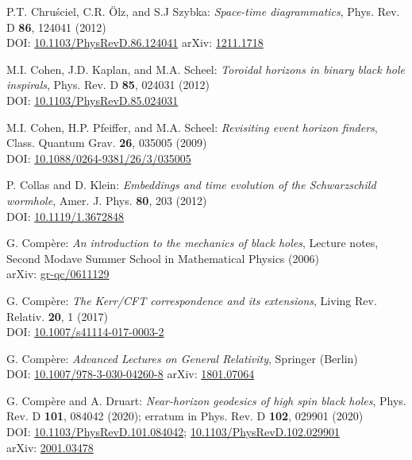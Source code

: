 \begin{thebibliography}{123}
P.T. Chru\'sciel, C.R. Ölz, and S.J Szybka:
{\em Space-time diagrammatics},
Phys. Rev. D {\bf 86}, 124041 (2012)\\
DOI:  \href{https://doi.org/10.1103/PhysRevD.86.124041}{10.1103/PhysRevD.86.124041}\hfill
arXiv: \href{https://arxiv.org/abs/1211.1718}{1211.1718}

M.I. Cohen, J.D. Kaplan, and M.A. Scheel:
{\em Toroidal horizons in binary black hole inspirals},
Phys. Rev. D {\bf 85}, 024031 (2012)\\
DOI:  \href{https://doi.org/10.1103/PhysRevD.85.024031}{10.1103/PhysRevD.85.024031}

M.I. Cohen, H.P. Pfeiffer, and M.A. Scheel:
{\em Revisiting event horizon finders},
Class. Quantum Grav. {\bf 26}, 035005 (2009)\\
DOI: \href{https://doi.org/10.1088/0264-9381/26/3/035005}{10.1088/0264-9381/26/3/035005}

P. Collas and D. Klein:
{\em Embeddings and time evolution of the Schwarzschild wormhole},
Amer. J. Phys. {\bf 80}, 203 (2012)\\
DOI: \href{https://doi.org/10.1119/1.3672848}{10.1119/1.3672848}

G. Compère:
{\em An introduction to the mechanics of black holes},
Lecture notes, Second Modave Summer School in Mathematical Physics (2006)\\
arXiv: \href{https://arxiv.org/abs/gr-qc/0611129}{gr-qc/0611129}

G. Compère:
{\em The Kerr/CFT correspondence and its extensions},
Living Rev. Relativ. {\bf 20}, 1 (2017)\\
DOI: \href{https://doi.org/10.1007/s41114-017-0003-2}{10.1007/s41114-017-0003-2}

G. Compère:
{\em Advanced Lectures on General Relativity},
Springer (Berlin)\\
DOI: \href{https://doi.org/10.1007/978-3-030-04260-8}{10.1007/978-3-030-04260-8}\hfill
arXiv: \href{https://arxiv.org/abs/1801.07064}{1801.07064}

G. Compère and A. Druart:
{\em Near-horizon geodesics of high spin black holes},
Phys. Rev. D {\bf 101}, 084042 (2020); erratum in Phys. Rev. D {\bf 102}, 029901 (2020)\\
DOI: \href{https://doi.org/10.1103/PhysRevD.101.084042}{10.1103/PhysRevD.101.084042};
\href{https://doi.org/10.1103/PhysRevD.102.029901}{10.1103/PhysRevD.102.029901}\\
arXiv: \href{https://arxiv.org/abs/2001.03478}{2001.03478}


\end{thebibliography}

